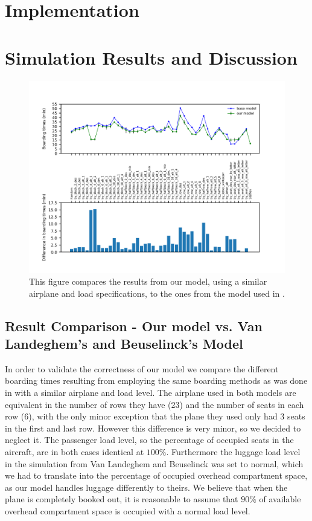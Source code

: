 \documentclass[11pt]{article}
\begin{document}
\section{Implementation}

\section{Simulation Results and Discussion}
\begin{figure}
	\includegraphics[width=\linewidth]{../../code/AirplaneBoarding/data/figure1/figure1.png}
	\caption{This figure compares the results from our model, using a similar airplane and load specifications, to the ones from the model used in \cite{beus}.}
	\label{figure1}
\end{figure}
\subsection{Result Comparison - Our model vs. Van Landeghem's and Beuselinck's Model}
In order to validate the correctness of our model we compare the different boarding times resulting from employing the same boarding methods as was done in \cite{beus} with a similar airplane and load level. The airplane used in both models are equivalent in the number of rows they have (23) and the number of seats in each row (6), with the only minor exception that the plane they used only had 3 seats in the first and last row. However this difference is very minor, so we decided to neglect it. The passenger load level, so the percentage of occupied seats in the aircraft, are in both cases identical at $100\%$. Furthermore the luggage load level in the simulation from Van Landeghem and Beuselinck was set to normal, which we had to translate into the percentage of occupied overhead compartment space, as our model handles luggage differently to theirs. We believe that when the plane is completely booked out, it is reasonable to assume that $90\%$ of available overhead compartment space is occupied with a normal load level.
\end{document}

